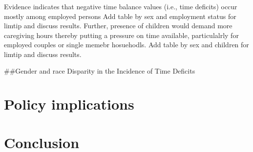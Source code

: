 \documentclass[
  11pt,
]{article}
\begin{document}
Evidence indicates that negative time balance values (i.e., time
deficits) occur mostly among employed persons Add table by sex and
employment status for limtip and discuss results. Further, presence of
children would demand more caregiving hours thereby putting a pressure
on time available, particulalrly for employed couples or single memebr
hosuehodls. Add table by sex and children for limtip and discuss
results.

\#\#Gender and race Disparity in the Incidence of Time Deficits

\section{Policy implications}\label{policy-implications}

\section{Conclusion}\label{conclusion}
\end{document}
